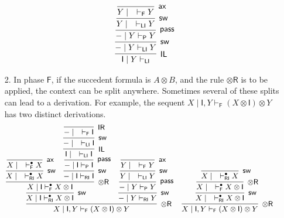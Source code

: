 \documentclass[copyright,creativecommons]{eptcs}
\theoremstyle{definition}
\newcommand{\tr}{\otimes \mathsf{R}}
\newcommand{\pass}{\mathsf{pass}}
\newcommand{\unitl}{\mathsf{IL}}
\newcommand{\unitr}{\mathsf{IR}}
\newcommand{\ax}{\mathsf{ax}}
\newcommand{\ot}{\otimes}
\newcommand{\I}{\mathsf{I}}
\newcommand{\RI}{\mathsf{RI}}
\newcommand{\LI}{\mathsf{LI}}
\newcommand{\Pass}{\mathsf{P}}
\newcommand{\F}{\mathsf{F}}
\begin{document}
\begin{enumerate}
\begin{equation*}
\begin{array}{cc}
{{{{{{{                  \infer[\unitl]{\I \mid Y \vdash_{\LI}}{
                    \infer[\mathsf{sw}]{{-} \mid Y \vdash_{\LI} Y}{
                      \infer[\pass]{{-} \mid Y \vdash_{\Pass} Y}{
                        \infer[\mathsf{sw}]{Y \mid \quad \vdash_{\LI} Y}{
                          \infer[\ax]{Y \mid \quad \vdash_{\F} Y}{}
                        }
                      }
                    }
                  }
                }
              }
            }
          }
        }
      }
    }
    \end{array}
    \normalsize
  \end{equation*}
  \item[2.] In phase $\F$, if the succedent formula is $A \ot B$, and the rule $\tr$ is to be applied, the context can be split anywhere. Sometimes
several of these splits can lead to a derivation.
  For example, the sequent $X \mid \I , Y \vdash_{\F} (X \ot \I) \ot Y$ has two distinct derivations.
  \begin{equation*}
\hspace*{-5mm}
  \small
    \begin{array}{cc}
      \infer[\tr]{X \mid \I , Y \vdash_{\F} (X \ot \I) \ot Y}{
       \infer[\mathsf{sw}]{X \mid \I \vdash^{\bullet}_{\RI} X \ot \I}{
         \infer[\tr]{X \mid \I \vdash_{\F}^\bullet X \ot \I}{
           \infer[\mathsf{sw}]{X \mid \quad \vdash^{\bullet}_{\RI} X}{
             \infer[\ax]{X \mid \quad \vdash_{\F}^\bullet X}{}
           }
           &
           \infer[\mathsf{sw}]{{-} \mid \I \vdash_{\RI} \I}{
             \infer[\pass]{{-} \mid \I \vdash_{\Pass} \I}{
               \infer[\unitl]{\I \mid \quad \vdash_{\LI} \I}{
                 \infer[\mathsf{sw}]{{-} \mid \quad \vdash_{\LI} \I}{
                   \infer[\unitr]{{-} \mid \quad \vdash_{\F} \I}{}
                 }
               }
             }
           }
         }
       }
       &
       \infer[\mathsf{sw}]{{-} \mid Y \vdash_{\RI} Y}{
         \infer[\pass]{{-} \mid Y \vdash_{\Pass} Y}{
           \infer[\mathsf{sw}]{Y \mid \quad \vdash_{\LI} Y}{
             \infer[\ax]{Y \mid \quad \vdash_{\F} Y}{}
           }
         }
       }
      }
      &
      \infer[\tr]{X \mid \I , Y \vdash_{\F} (X \ot \I) \ot Y}{
       \infer[\mathsf{sw}]{X \mid \quad \vdash^{\bullet}_{\RI} X \ot \I}{
         \infer[\tr]{X \mid \quad \vdash_{\F}^\bullet X \ot \I}{
           \infer[\mathsf{sw}]{X \mid \quad \vdash^{\bullet}_{\RI} X}{
}}}}
\end{array}
\end{equation*}
\end{enumerate}
\end{document}
